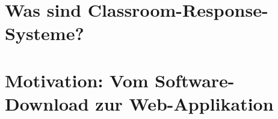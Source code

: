 \section{Was sind Classroom-Response-Systeme?}
\label{chap:was_sind_crs}


\newpage
\section{Motivation: Vom Software-Download zur Web-Applikation}
\label{chap:webapp}
